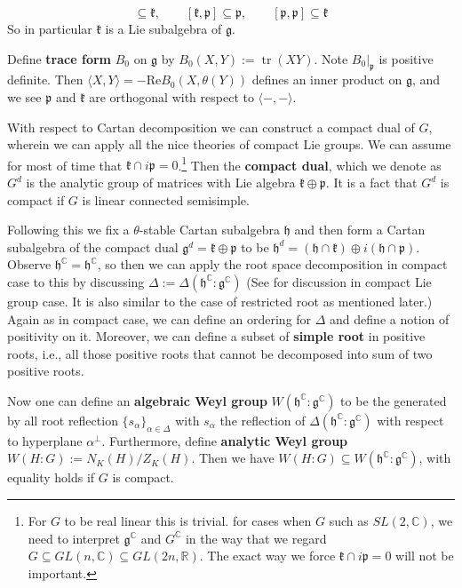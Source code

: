 \documentclass[11pt]{report}
\theoremstyle{definition}
\theoremstyle{plain}
\DeclareMathOperator{\tr}{tr}
\newcommand{\real}{\mathbb{R}}
\newcommand{\complex}{\mathbb{C}}
\newcommand{\brac}[1]{\langle #1 \rangle}
\newcommand{\Lie}[1]{\mathfrak{#1}}
\renewcommand{\Re}{\mathrm{Re}}
\begin{document}
\begin{equation}
[\Lie{k}, \Lie{k}]\subseteq \Lie{k},\qquad  [\Lie{k}, \Lie{p}]\subseteq \Lie{p},\qquad  [\Lie{p}, \Lie{p}]\subseteq \Lie{k}
\end{equation}
So in particular $\Lie{k}$ is a Lie subalgebra of $\Lie{g}$. 
\par Define \textbf{trace form} $B_0$ on $\Lie{g}$ by $B_0(X, Y):=\tr(XY)$. Note $B_0|_\Lie{p}$ is positive definite. Then $\brac{X, Y}=-\Re B_0(X,\theta(Y))$ defines an inner product on $\Lie{g}$, and we see $\Lie{p}$ and $\Lie{k}$ are orthogonal with respect to $\brac{-,-}$.
\par With respect to Cartan decomposition we can construct a compact dual of $G$, wherein we can apply all the nice theories of compact Lie groups. We can assume for most of time that $\Lie{k}\cap i\Lie{p}=0$.\footnote{For $G$ to be real linear this is trivial. for cases when $G$ such as $SL(2, \complex)$, we need to interpret $\Lie{g}^\complex$ and $G^\complex$ in the way that we regard $G\subseteq GL(n,\complex)\subseteq GL(2n, \real)$. The exact way we force $\Lie{k}\cap i\Lie{p}=0$ will not be important.} Then the \textbf{compact dual}, which we denote as $G^d$ is the analytic group of matrices with Lie algebra $\Lie{k}\oplus \Lie{p}$. It is a fact \cite[Proposition~5.3]{knapp2016} that $G^d$ is compact if $G$ is linear connected semisimple. 
\par Following this we fix a $\theta$-stable Cartan subalgebra $\Lie{h}$ and then form a Cartan subalgebra of the compact dual $\Lie{g}^d=\Lie{k}\oplus \Lie{p}$ to be $\Lie{h}^d=\Lie{(h\cap k)}\oplus i\Lie{(h\cap p)}$. Observe $\Lie{h}^\complex=\Lie{h}^\complex$, so then we can apply the root space decomposition in compact case to this by discussing $\Delta:=\Delta(\Lie{h}^\complex:\Lie{g}^\complex)$ (See \cite[Chapter~IV]{knapp2016} for discussion in compact Lie group case. It is also similar to the case of restricted root as mentioned later.) Again as in compact case, we can define an ordering for $\Delta$ and define a notion of positivity on it. Moreover, we can define a subset of \textbf{simple root} in positive roots, i.e., all those positive roots that cannot be decomposed into sum of two positive roots.
\par Now one can define an \textbf{algebraic Weyl group} $W(\Lie{h}^\complex:\Lie{g}^\complex) $ to be the generated by all root reflection $\{s_\alpha\}_{\alpha\in \Delta}$ with $s_\alpha$ the reflection of $\Delta(\Lie{h}^\complex:\Lie{g}^\complex)$ with respect to hyperplane $\alpha^\perp$. Furthermore, define \textbf{analytic Weyl group} $W(H:G):=N_K(H)/Z_K(H)$. Then we have $W(H:G)\subseteq W(\Lie{h}^\complex:\Lie{g}^\complex)$, with equality holds if $G$ is compact. 
\end{document}
